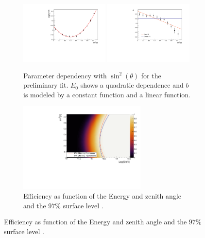 \documentclass[12pt,a4paper]{article}
\begin{document}
\begin{figure}[]
\begin{figure}[h]
    \begin{center}
        \includegraphics[width=0.49\textwidth]{plots/E0.pdf}
        \includegraphics[width=0.49\textwidth]{plots/b.pdf}
        \caption{Parameter dependency with $\sin^2(\theta)$ for the preliminary fit. $E_0$ shows a quadratic dependence and $b$ is modeled by a constant function and a linear function.
        \label{fig:parameters}}
    \end{center}
\end{figure} 



\begin{figure}[h]
    \begin{center}
        \includegraphics[width=0.7\textwidth]{plots/Surface.pdf}
        \caption{Efficiency as function of the Energy and zenith angle and the $97\%$ surface level .
        \label{fig:surface}}
    \end{center}
\end{figure}  


\end{figure}
\end{document}
